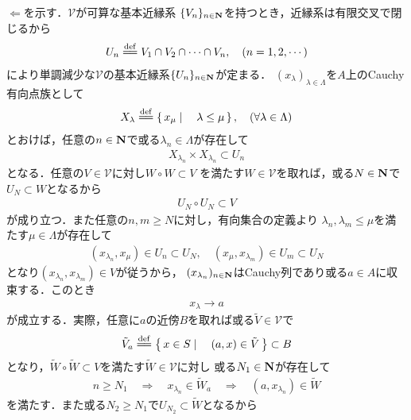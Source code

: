 	\begin{prf}
		$\Longleftarrow$を示す．$\mathscr{V}$が可算な基本近縁系
		$\{V_n\}_{n \in \mathbf{N}}$を持つとき，近縁系は有限交叉で閉じるから
		\begin{align}
			U_n \defeq V_1 \cap V_2 \cap \cdots \cap V_n,
			\quad (n = 1,2,\cdots)
		\end{align}
		により単調減少な$\mathscr{V}$の基本近縁系$\{U_n\}_{n \in \mathbf{N}}$が定まる．
		$(x_\lambda)_{\lambda \in \Lambda}$を$A$上のCauchy有向点族として
		\begin{align}
			X_\lambda \defeq \Set{x_\mu}{\lambda \leq \mu},
			\quad (\forall \lambda \in \Lambda)
		\end{align}
		とおけば，任意の$n \in \mathbf{N}$で或る$\lambda_n \in \Lambda$が存在して
		\begin{align}
			X_{\lambda_n} \times X_{\lambda_n} \subset U_n
		\end{align}
		となる．任意の$V \in \mathscr{V}$に対し$W \circ W \subset V$
		を満たす$W \in \mathscr{V}$を取れば，或る$N \in \mathbf{N}$で$U_N \subset W$となるから
		\begin{align}
			U_N \circ U_N \subset V
		\end{align}
		が成り立つ．また任意の$n,m \geq N$に対し，有向集合の定義より
		$\lambda_n,\lambda_m \leq \mu$を満たす$\mu \in \Lambda$が存在して
		\begin{align}
			(x_{\lambda_n},x_\mu) \in U_n \subset U_N,
			\quad (x_\mu, x_{\lambda_m}) \in U_m \subset U_N
		\end{align}
		となり$(x_{\lambda_n},x_{\lambda_m}) \in V$が従うから，
		$(x_{\lambda_n})_{n \in \mathbf{N}}$はCauchy列であり或る$a \in A$に収束する．このとき
		\begin{align}
			x_\lambda \longrightarrow a
			\label{eq:thm_complete_iff_every_Cauchy_seq_converges_if_entourage_contains_some_countable_subset}
		\end{align}
		が成立する．実際，任意に$a$の近傍$B$を取れば或る$\tilde{V} \in \mathscr{V}$で
		\begin{align}
			\tilde{V}_a \defeq \Set{x \in S}{(a,x) \in \tilde{V}} \subset B
		\end{align}
		となり，$\tilde{W} \circ \tilde{W} \subset V$を満たす$\tilde{W} \in \mathscr{V}$に対し
		或る$N_1 \in \mathbf{N}$が存在して
		\begin{align}
			n \geq N_1 \quad \Longrightarrow \quad
			x_{\lambda_n} \in \tilde{W}_a \quad \Longrightarrow \quad
			(a,x_{\lambda_n}) \in \tilde{W}
		\end{align}
		を満たす．また或る$N_2 \geq N_1$で$U_{N_2} \subset \tilde{W}$となるから

\end{prf}
